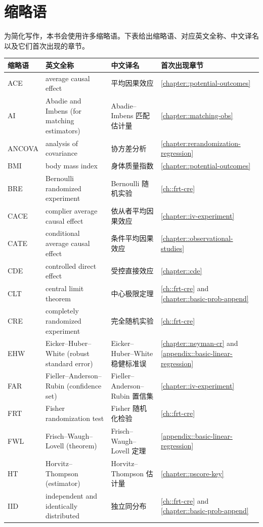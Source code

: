\chapter*{缩略语}

为简化写作，本书会使用许多缩略语。下表给出缩略语、对应英文全称、中文译名以及它们首次出现的章节。

\begin{tabular}{llll}
\hline 
缩略语 & 英文全称 & 中文译名 & 首次出现章节 \\
\hline 
ACE& average causal effect& 平均因果效应 & \ref{chapter::potential-outcomes} \\
AI & Abadie and Imbens (for matching estimators) & Abadie--Imbens 匹配估计量 & \ref{chapter::matching-obs} \\
ANCOVA & analysis of covariance & 协方差分析 & \ref{chapter:rerandomization-regression}\\
BMI & body mass index & 身体质量指数 & \ref{chapter::potential-outcomes} \\
BRE & Bernoulli randomized experiment & Bernoulli 随机实验 & \ref{ch::frt-cre}\\
CACE & complier average causal effect & 依从者平均因果效应 & \ref{chapter::iv-experiment} \\
CATE & conditional average causal effect & 条件平均因果效应 & \ref{chapter::observational-studies}\\
CDE & controlled direct effect & 受控直接效应 & \ref{chapter::cde} \\
CLT & central limit theorem & 中心极限定理 & \ref{ch::frt-cre} and \ref{chapter::basic-prob-append} \\
CRE & completely randomized experiment & 完全随机实验 & \ref{ch::frt-cre} \\
EHW& Eicker--Huber--White (robust standard error) & Eicker--Huber--White 稳健标准误 & \ref{chapter::neyman-cr} and \ref{appendix::basic-linear-regression}\\
FAR & Fieller--Anderson--Rubin (confidence set) & Fieller--Anderson--Rubin 置信集 & \ref{chapter::iv-experiment}\\
FRT & Fisher randomization test & Fisher 随机化检验 & \ref{ch::frt-cre} \\
FWL & Frisch--Waugh--Lovell (theorem) & Frisch--Waugh--Lovell 定理 & \ref{appendix::basic-linear-regression} \\
HT& Horvitz--Thompson (estimator) & Horvitz--Thompson 估计量 & \ref{chapter::pscore-key}\\
IID & independent and identically distributed & 独立同分布 & \ref{ch::frt-cre} and \ref{chapter::basic-prob-append} \\

\end{tabular}
